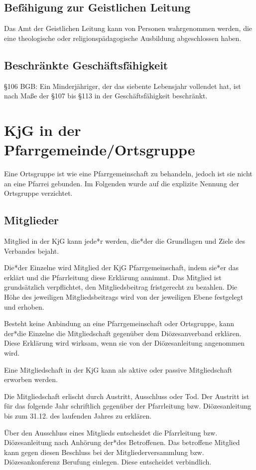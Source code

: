 \documentclass[12pt]{report}
\begin{document}
\begin{justify}
\section{Befähigung zur Geistlichen Leitung} \label{geistlicheleitung}
Das Amt der Geistlichen Leitung kann von Personen wahrgenommen werden,
die eine theologische oder religionspädagogische Ausbildung abgeschlossen haben.

\section{Beschränkte Geschäftsfähigkeit} \label{geschaeftsfaehigkeit}
§106 BGB: Ein Minderjähriger, der das siebente Lebensjahr vollendet hat, ist nach Maße der §107 bis §113 in
der Geschäftsfähigkeit beschränkt.


\chapter{KjG in der Pfarrgemeinde/Ortsgruppe}
Eine Ortsgruppe ist wie eine Pfarrgemeinschaft zu behandeln, jedoch ist sie nicht an eine Pfarrei
gebunden. Im Folgenden wurde auf die explizite Nennung der Ortsgruppe verzichtet.
\section{Mitglieder}
Mitglied in der KjG kann jede*r werden, die*der die Grundlagen und Ziele des Verbandes bejaht.

Die*der Einzelne wird Mitglied der KjG Pfarrgemeinschaft, indem sie*er das erklärt und die Pfarrleitung diese Erklärung annimmt.
Das Mitglied ist grundsätzlich verpflichtet, den Mitgliedsbeitrag fristgerecht zu bezahlen.
Die Höhe des jeweiligen Mitgliedsbeitrags wird von der jeweiligen
Ebene festgelegt und erhoben.

Besteht keine Anbindung an eine Pfarrgemeinschaft oder Ortsgruppe, kann der*die Einzelne
die Mitgliedschaft gegenüber dem Diözesanverband erklären. Diese Erklärung wird wirksam,
wenn sie von der Diözesanleitung angenommen wird.

Eine Mitgliedschaft in der KjG kann als aktive oder passive Mitgliedschaft erworben werden.

Die Mitgliedschaft erlischt durch Austritt, Ausschluss oder Tod. Der Austritt ist für das folgende Jahr
schriftlich gegenüber der Pfarrleitung bzw. Diözesanleitung bis zum 31.12. des laufenden Jahres zu erklären.

Über den Ausschluss eines Mitglieds entscheidet die Pfarrleitung bzw. Diözesanleitung nach Anhörung der*des Betroffenen.
Das betroffene Mitglied kann gegen diesen Beschluss bei der
Mitgliederversammlung bzw. Diözesankonferenz Berufung einlegen. Diese entscheidet verbindlich.

\end{justify}
\end{document}
